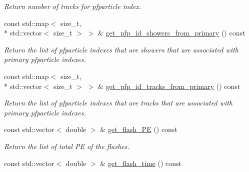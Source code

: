 \begin{DoxyCompactItemize}
\begin{DoxyCompactList}\small\item\em Return number of tracks for pfparticle index. \end{DoxyCompactList}\item 
\hypertarget{classlee_1_1ElectronEventSelectionAlg_a7ea645ce175506b368ceb116bbb77889}{const std\-::map$<$ size\-\_\-t, \\*
std\-::vector$<$ size\-\_\-t $>$ $>$ \& \hyperlink{classlee_1_1ElectronEventSelectionAlg_a7ea645ce175506b368ceb116bbb77889}{get\-\_\-pfp\-\_\-id\-\_\-showers\-\_\-from\-\_\-primary} () const }\label{classlee_1_1ElectronEventSelectionAlg_a7ea645ce175506b368ceb116bbb77889}

\begin{DoxyCompactList}\small\item\em Return the list of pfparticle indexes that are showers that are associated with primary pfparticle indexes. \end{DoxyCompactList}\item 
\hypertarget{classlee_1_1ElectronEventSelectionAlg_a00266c70e046a9ee27e979be75925a09}{const std\-::map$<$ size\-\_\-t, \\*
std\-::vector$<$ size\-\_\-t $>$ $>$ \& \hyperlink{classlee_1_1ElectronEventSelectionAlg_a00266c70e046a9ee27e979be75925a09}{get\-\_\-pfp\-\_\-id\-\_\-tracks\-\_\-from\-\_\-primary} () const }\label{classlee_1_1ElectronEventSelectionAlg_a00266c70e046a9ee27e979be75925a09}

\begin{DoxyCompactList}\small\item\em Return the list of pfparticle indexes that are tracks that are associated with primary pfparticle indexes. \end{DoxyCompactList}\item 
\hypertarget{classlee_1_1ElectronEventSelectionAlg_a306e62904f73e727c6f938d2a197f68e}{const std\-::vector$<$ double $>$ \& \hyperlink{classlee_1_1ElectronEventSelectionAlg_a306e62904f73e727c6f938d2a197f68e}{get\-\_\-flash\-\_\-\-P\-E} () const }\label{classlee_1_1ElectronEventSelectionAlg_a306e62904f73e727c6f938d2a197f68e}

\begin{DoxyCompactList}\small\item\em Return the list of total P\-E of the flashes. \end{DoxyCompactList}\item 
\hypertarget{classlee_1_1ElectronEventSelectionAlg_a9990f4a980662e786fc8e38146ce4456}{const std\-::vector$<$ double $>$ \& \hyperlink{classlee_1_1ElectronEventSelectionAlg_a9990f4a980662e786fc8e38146ce4456}{get\-\_\-flash\-\_\-time} () const }\label{classlee_1_1ElectronEventSelectionAlg_a9990f4a980662e786fc8e38146ce4456}


\end{DoxyCompactItemize}
